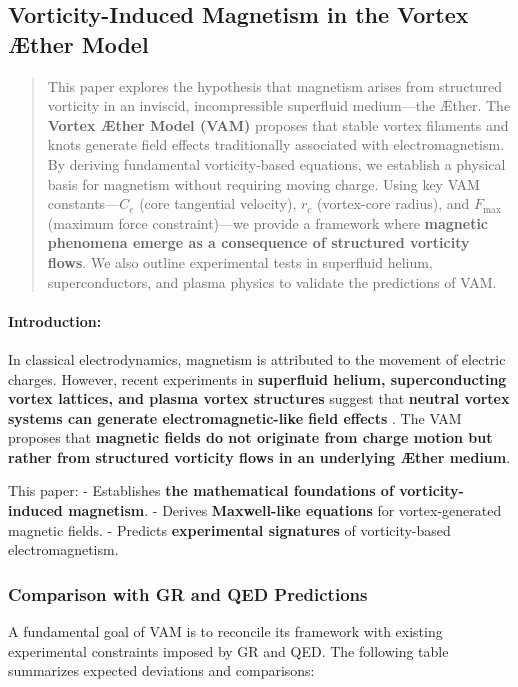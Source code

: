 
\subsection{Vorticity-Induced Magnetism in the Vortex \AE ther Model}


    \begin{abstract}
        This paper explores the hypothesis that magnetism arises from structured vorticity in an inviscid, incompressible superfluid medium—the \AE ther. The \textbf{Vortex \AE ther Model (VAM)} proposes that stable vortex filaments and knots generate field effects traditionally associated with electromagnetism. By deriving fundamental vorticity-based equations, we establish a physical basis for magnetism without requiring moving charge. Using key VAM constants—\( C_e \) (core tangential velocity), \( r_c \) (vortex-core radius), and \( F_{\text{max}} \) (maximum force constraint)—we provide a framework where \textbf{magnetic phenomena emerge as a consequence of structured vorticity flows}.
        We also outline experimental tests in superfluid helium, superconductors, and plasma physics to validate the predictions of VAM.
    \end{abstract}

    \paragraph*{Introduction:}
    In classical electrodynamics, magnetism is attributed to the movement of electric charges.
    However, recent experiments in \textbf{superfluid helium, superconducting vortex lattices, and plasma vortex structures} suggest that \textbf{neutral vortex systems can generate electromagnetic-like field effects} \cite{superfluid_he_interferometers}.
    The VAM proposes that \textbf{magnetic fields do not originate from charge motion but rather from structured vorticity flows in an underlying Æther medium}.

    This paper:
    - Establishes \textbf{the mathematical foundations of vorticity-induced magnetism}.
    - Derives \textbf{Maxwell-like equations} for vortex-generated magnetic fields.
    - Predicts \textbf{experimental signatures} of vorticity-based electromagnetism.


\subsubsection*{Comparison with GR and QED Predictions}
A fundamental goal of VAM is to reconcile its framework with existing experimental constraints imposed by GR and QED. The following table summarizes expected deviations and comparisons:

